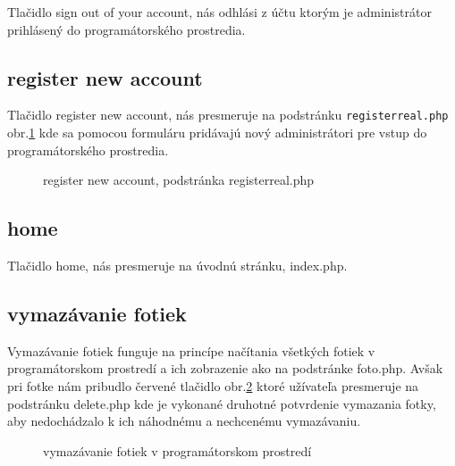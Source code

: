 Tlačidlo sign out of your account, nás odhlási z účtu ktorým je administrátor prihlásený do programátorského prostredia.

\pagebreak

\subsection{register new account}

Tlačidlo register new account, nás presmeruje na podstránku \verb|registerreal.php| obr.\ref{OBRAZOK 1.14} kde sa pomocou formuláru pridávajú nový administrátori pre vstup do programátorského prostredia.

\begin{figure}[!tbh]
\centering
\setlength{\fboxsep}{0pt}%
\setlength{\fboxrule}{1pt}%
\caption{register new account, podstránka registerreal.php}\label{OBRAZOK 1.14}
\end{figure}

\subsection{home}

Tlačidlo home, nás presmeruje na úvodnú stránku, index.php.

\subsection{vymazávanie fotiek}

Vymazávanie fotiek funguje na princípe načítania všetkých fotiek v programátorskom prostredí a ich zobrazenie ako na podstránke foto.php. Avšak pri fotke nám pribudlo červené tlačidlo obr.\ref{OBRAZOK 1.15} ktoré užívateľa presmeruje na podstránku delete.php kde je vykonané druhotné potvrdenie vymazania fotky, aby nedochádzalo k ich náhodnému a nechcenému vymazávaniu.

\begin{figure}[!tbh]
\centering
\setlength{\fboxsep}{0pt}%
\setlength{\fboxrule}{1pt}%
\caption{vymazávanie fotiek v programátorskom prostredí}\label{OBRAZOK 1.15}
\end{figure} 